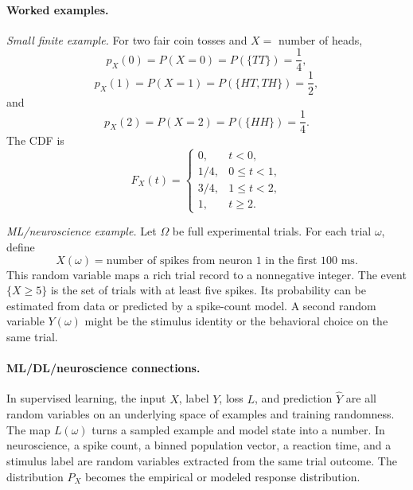 \paragraph{Worked examples.}
\emph{Small finite example.} For two fair coin tosses and \(X=\) number of heads,
\[
p_X(0)=P(X=0)=P(\{TT\})=\frac14,
\]
\[
p_X(1)=P(X=1)=P(\{HT,TH\})=\frac12,
\]
and
\[
p_X(2)=P(X=2)=P(\{HH\})=\frac14.
\]
The CDF is
\[
F_X(t)=
\begin{cases}
0, & t<0,\\
1/4, & 0\leq t<1,\\
3/4, & 1\leq t<2,\\
1, & t\geq2.
\end{cases}
\]

\emph{ML/neuroscience example.} Let \(\Omega\) be full experimental trials. For each trial \(\omega\), define
\[
X(\omega)=\text{number of spikes from neuron 1 in the first }100\text{ ms}.
\]
This random variable maps a rich trial record to a nonnegative integer. The event \(\{X\geq5\}\) is the set of trials with at least five spikes. Its probability can be estimated from data or predicted by a spike-count model. A second random variable \(Y(\omega)\) might be the stimulus identity or the behavioral choice on the same trial.

\paragraph{ML/DL/neuroscience connections.}
In supervised learning, the input \(X\), label \(Y\), loss \(L\), and prediction \(\widehat{Y}\) are all random variables on an underlying space of examples and training randomness. The map \(L(\omega)\) turns a sampled example and model state into a number. In neuroscience, a spike count, a binned population vector, a reaction time, and a stimulus label are random variables extracted from the same trial outcome. The distribution \(P_X\) becomes the empirical or modeled response distribution.

